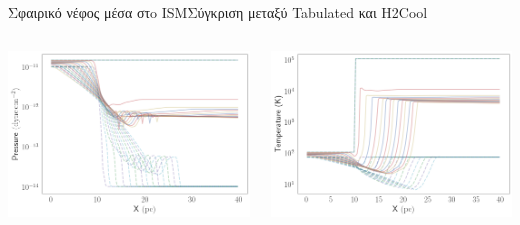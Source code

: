 \documentclass{beamer}
\begin{document}
\begin{frame}{Σφαιρικό νέφος μέσα στo ISM}{Σύγκριση μεταξύ Tabulated και H2Cool}
	
\begin{columns}
	\begin{center}
		\includegraphics[width=1\linewidth]{../Document/DataImages/diffH2CoolTabCoolPRSprofile}
	\end{center}
\begin{center}
	\includegraphics[width=1\linewidth]{../Document/DataImages/diffH2CoolTabCoolTMPprofile}
\end{center}
	

	
\end{columns}
\end{frame}
\end{document}
